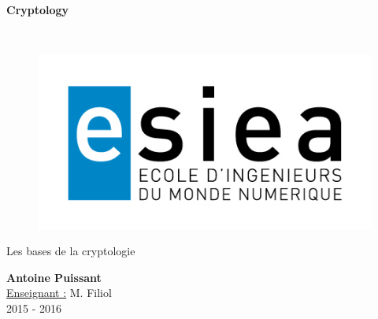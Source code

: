 \begin{titlepage}
      \begin{center}   
        \Huge
        \textbf{Cryptology}
        
        \LARGE
        ~
        
        
        \vfill
        \begin{figure}[H]
	    \centering
	    \begin{minipage}{0.9\textwidth}
		\centering
		\includegraphics[width=\textwidth]{./img/esiea.jpeg}
	    \end{minipage}\hfill
	\end{figure}
        \vfill
        
        \vspace{0.5cm}
        
        Les bases de la cryptologie
        
        \vspace{2cm}
        \textbf{Antoine Puissant}\\
        \vspace{0.8cm}
        \Large
        \underline{Enseignant :} M. Filiol\\
        \vspace{0.5cm}
        2015 - 2016%
        
    \end{center}
\end{titlepage}